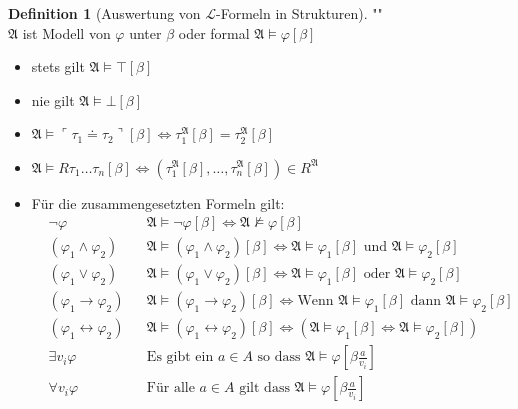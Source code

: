 \documentclass[12pt,parskip=full]{scrartcl}
\newcommand{\corners}[1]{{\ulcorner #1 \urcorner }}
\theoremstyle{definition}
\newtheorem{definition}[theorem]{Definition}
\begin{document}
	\begin{definition}[Auswertung von $\mathcal{L}$-Formeln in Strukturen]""\\
		$\mathfrak{A}$ ist Modell von $\varphi$ unter $\beta$ oder formal $\mathfrak{A} \models \varphi[\beta]$
		\begin{itemize}
			\item stets gilt $\mathfrak{A} \models \top[\beta]$
			\item nie gilt $\mathfrak{A} \models \bot[\beta]$
			\item $\mathfrak{A} \models \corners{\tau_1 \doteq \tau_2}[\beta] \Leftrightarrow \tau_1^\mathfrak{A}[\beta] = \tau_2^\mathfrak{A}[\beta]$
			\item $\mathfrak{A} \models R \tau_1 \dots \tau_n [\beta] \Leftrightarrow (\tau_1^\mathfrak{A}[\beta], \dots, \tau_n^\mathfrak{A}[\beta]) \in R^\mathfrak{A}$
			\item Für die zusammengesetzten Formeln gilt:
			\begin{align*}
				&\lnot \varphi && \mathfrak{A} \models \lnot \varphi[\beta] \Leftrightarrow \mathfrak{A} \not\models \varphi[\beta] \\
				&(\varphi_1 \land \varphi_2) && \mathfrak{A} \models (\varphi_1 \land \varphi_2) [\beta] \Leftrightarrow \mathfrak{A} \models \varphi_1[\beta] \text{ und } \mathfrak{A} \models \varphi_2[\beta] \\
				&(\varphi_1 \lor \varphi_2) && \mathfrak{A} \models (\varphi_1 \lor \varphi_2) [\beta] \Leftrightarrow \mathfrak{A} \models \varphi_1[\beta] \text{ oder } \mathfrak{A} \models \varphi_2[\beta] \\
				&(\varphi_1 \rightarrow \varphi_2)  && \mathfrak{A} \models (\varphi_1 \rightarrow \varphi_2) [\beta] \Leftrightarrow \text{Wenn } \mathfrak{A} \models \varphi_1[\beta] \text{ dann } \mathfrak{A} \models \varphi_2[\beta] \\
				&(\varphi_1 \leftrightarrow \varphi_2)  && \mathfrak{A} \models (\varphi_1 \leftrightarrow \varphi_2) [\beta] \Leftrightarrow (\mathfrak{A} \models \varphi_1[\beta] \Leftrightarrow \mathfrak{A} \models \varphi_2[\beta]) \\
				&\exists v_i \varphi && \text{Es gibt ein $a \in A$ so dass $\mathfrak{A} \models \varphi\left[\beta \frac{a}{v_i}\right]$}\\
				&\forall v_i \varphi && \text{Für alle $a \in A$ gilt dass $\mathfrak{A} \models \varphi\left[\beta \frac{a}{v_i}\right]$}
			\end{align*}
		\end{itemize}
	\end{definition}
	
\end{document}
